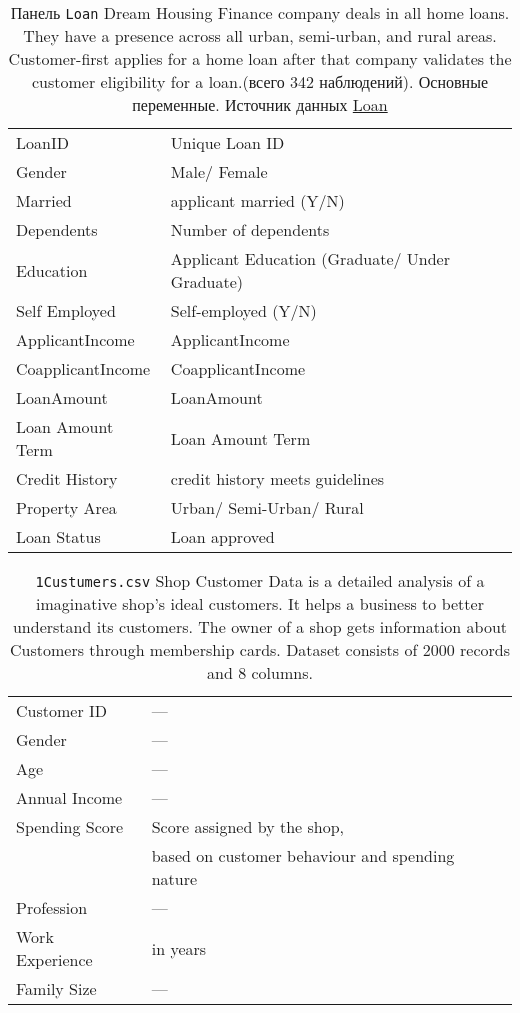 \documentclass[12pt]{article}
\theoremstyle{remark}
\begin{document}
\begin{table}
	\caption{Панель \texttt{Loan}
	Dream Housing Finance company deals in all home loans. They have a presence across all urban, semi-urban, and rural areas. Customer-first applies for a home loan after that company validates the customer eligibility for a loan.(всего 342 наблюдений).  Основные переменные.
	Источник данных \href{https://www.kaggle.com/datasets/vikasukani/loan-eligible-dataset?select=loan-train.csv}{Loan}}
	\label{Gasoline}
	\begin{tabular}{l|l}\hline
	LoanID & Unique Loan ID \\
	Gender & Male/ Female  \\
	Married & applicant married (Y/N) \\
	Dependents & Number of dependents \\
Education & Applicant Education (Graduate/ Under Graduate)\\
Self Employed & Self-employed (Y/N)\\
ApplicantIncome & ApplicantIncome\\
CoapplicantIncome & CoapplicantIncome \\
LoanAmount & LoanAmount \\
Loan Amount Term & Loan Amount Term \\
Credit History & credit history meets guidelines \\
Property Area & Urban/ Semi-Urban/ Rural \\
Loan Status &	Loan approved \\
\end{tabular}
\end{table}
\begin{table}
	\caption{ \texttt{1Custumers.csv}
	Shop Customer Data is a detailed analysis of a imaginative shop's ideal customers. It helps a business to better understand its customers. The owner of a shop gets information about Customers through membership cards. Dataset consists of 2000 records and 8 columns.}
	\label{Gasoline}
	\begin{tabular}{l|l}\hline
	Customer ID & --- \\
	Gender & ---\\ 
	Age & --- \\
	Annual Income & --- \\
	Spending Score & Score assigned by the shop,\\
	 & based on customer behaviour and spending nature\\
	Profession & --- \\
	Work Experience & in years\\
	Family Size & --- \\
	\hline
	\end{tabular}
\end{table}
\end{document}
